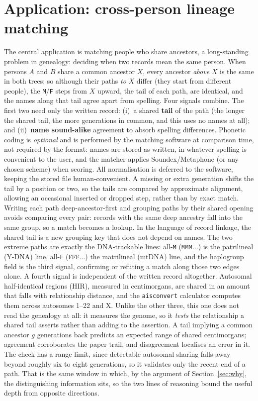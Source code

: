 \documentclass[11pt]{article}
\begin{document}
\section{Application: cross-person lineage matching}
\label{sec:matching}
The central application is matching people who share ancestors, a long-standing problem in
genealogy: deciding when two records mean the same person. When persons $A$ and $B$ share a common
ancestor $X$, every ancestor \emph{above} $X$ is the same in both trees; so although their paths
\emph{to} $X$ differ (they start from different people), the \texttt{M}/\texttt{F} steps from $X$
upward, the tail of each path, are identical, and the names along that tail agree apart from
spelling. Four signals combine. The first two need only the written record: (i)~a shared \textbf{tail} of the path (the longer the
shared tail, the more generations in common, and this uses no names at all); and (ii)~\textbf{name
sound-alike} agreement \cite{russell1918, philips1990} to absorb spelling differences.
Phonetic coding is \emph{optional} and is performed by the matching software at comparison time, not
required by the format: names are stored as written, in whatever spelling is convenient to the user,
and the matcher applies Soundex/Metaphone (or any chosen scheme) when scoring. All normalisation is
deferred to the software, keeping the stored file human-convenient.
A missing or extra generation shifts the tail by a position or two, so the tails are compared by
approximate alignment, allowing an occasional inserted or dropped step, rather than by exact match.
Writing each path deep-ancestor-first and grouping paths by their shared opening avoids comparing
every pair: records with the same deep ancestry fall into the same group, so a match becomes a
lookup. In the language of record linkage, the shared tail is a new grouping key that does not depend
on names. The two extreme paths are exactly the DNA-trackable lines: all-\texttt{M}
($\mathtt{MMM}\dots$) is the patrilineal (Y-DNA) line, all-\texttt{F} ($\mathtt{FFF}\dots$) the
matrilineal (mtDNA) line, and the haplogroup field is the third signal, confirming or refuting a match along those two
edges alone. A fourth signal is independent of the written record altogether. Autosomal half-identical regions
(HIR), measured in centimorgans, are shared in an amount that falls with relationship distance, and the
\texttt{aisconvert} calculator \cite{aisconvert} computes them across autosomes 1--22 and X. Unlike
the other three, this one does not read the genealogy at all: it measures the genome, so it
\emph{tests} the relationship a shared tail asserts rather than adding to the assertion. A tail
implying a common ancestor $g$ generations back predicts an expected range of shared centimorgans;
agreement corroborates the paper trail, and disagreement localises an error in it. The check has a
range limit, since detectable autosomal sharing falls away beyond roughly six to eight generations, so
it validates only the recent end of a path. That is the same window in which, by the argument of
Section~\ref{sec:why}, the distinguishing information sits, so the two lines of reasoning bound the
useful depth from opposite directions.
\end{document}
